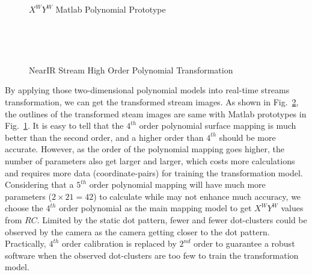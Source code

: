 %
\begin{figure}[!t]
\hspace*{-0.3cm}
\centering
{}
{}

{}
%
\caption{\(X^W\)\(Y^W\) Matlab Polynomial Prototype}
\label{MatlabPrototpyeOfHighOrder}
\end{figure}%
%
\\\indent
\begin{figure}[!t]
\centering
\hspace*{-0.3cm}
%
%
\\%
\hspace*{-0.3cm}
%
%
\caption{NearIR Stream High Order Polynomial Transformation}
\label{HighOrderNearIRRectification}
\end{figure}%
%
By applying those two-dimensional polynomial models into real-time streams transformation, we can get the transformed stream images. As shown in Fig.~\ref{HighOrderNearIRRectification}, the outlines of the transformed steam images are same with Matlab prototypes in Fig.~\ref{MatlabPrototpyeOfHighOrder}. It is easy to tell that the \(4^{th}\) order polynomial surface mapping is much better than the second order, and a higher order than \(4^{th}\) should be more accurate. However, as the order of the polynomial mapping goes higher, the number of parameters also get larger and larger, which costs more calculations and requires more data (coordinate-pairs) for training the transformation model. Considering that a \(5^{th}\) order polynomial mapping will have much more  parameters ($2\times21=42$) to calculate while may not enhance much accuracy, we choose the \(4^{th}\) order polynomial as the main mapping model to get \(X^WY^W\) values from \(RC\). Limited by the static dot pattern, fewer and fewer dot-clusters could be observed by the camera as the camera getting closer to the dot pattern. Practically, \(4^{th}\) order calibration is replaced by \(2^{nd}\) order to guarantee a robust software when the observed dot-clusters are too few to train the transformation model.
